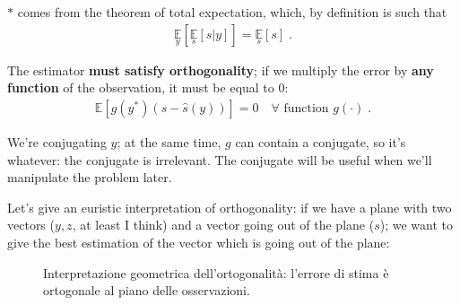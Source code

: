 \documentclass[a4paper, 12pt]{book}
\begin{document}
\begin{tcolorbox}[sharp corners, boxrule=0pt, leftrule=2pt, colframe=green!60!black, colback=green!5, left=5pt, top=3pt, bottom=3pt]
    $*$ comes from the \textcolor{green!60!black}{theorem of total expectation}, which, by definition is such that
    \begin{align*}
    \underset{y}{\mathbb{E}}[\underset{s}{\mathbb{E}}[s|y]] = \underset{s}{\mathbb{E}}[s] \;.
    \end{align*}
\end{tcolorbox}

The estimator \textbf{must satisfy orthogonality}; if we multiply the error by \textbf{any function} of the observation, it must be equal to 0:
\begin{align*}
\mathbb{E}[g(y^*) (s - \hat{s}(y))] = 0 \quad \forall \text{ function } g(\cdot) \;.
\end{align*}

\begin{tcolorbox}[sharp corners, boxrule=0pt, leftrule=2pt, colframe=green!60!black, colback=green!5, left=5pt, top=3pt, bottom=3pt]
    We're conjugating $y$; at the same time, $g$ can contain a conjugate, so it's whatever: the conjugate is irrelevant.
    The conjugate will be useful when we'll manipulate the problem later.
\end{tcolorbox}

Let's give an euristic interpretation of orthogonality: if we have a plane with two vectors ($y, z$, at least I think) and a vector going out of the plane ($s$); we want to give the best estimation of the vector which is going out of the plane:

\begin{figure}[h!]
    \centering
    \caption{Interpretazione geometrica dell'ortogonalità: l'errore di stima è ortogonale al piano delle osservazioni.}
\end{figure}
\end{document}
